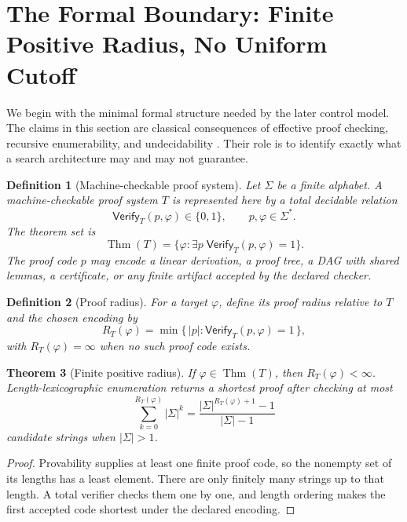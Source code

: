 \documentclass[11pt]{article}
\newtheorem{definition}{Definition}[section]
\newtheorem{theorem}[definition]{Theorem}
\newcommand{\Thm}{\operatorname{Thm}}
\newcommand{\Verify}{\mathsf{Verify}}
\begin{document}
\section{The Formal Boundary: Finite Positive Radius, No Uniform Cutoff}

We begin with the minimal formal structure needed by the later control model.
The claims in this section are classical consequences of effective proof
checking, recursive enumerability, and undecidability
\citep{church1936,turing1936,dean2025difficulty}.  Their role is to identify
exactly what a search architecture may and may not guarantee.

\begin{definition}[Machine-checkable proof system]\label{def:machine-checkable}
Let $\Sigma$ be a finite alphabet.  A machine-checkable proof system $T$ is
represented here by a total decidable relation
\[
  \Verify_T(p,\varphi)\in\{0,1\},
  \qquad p,\varphi\in\Sigma^*.
\]
The theorem set is
\[
  \Thm(T)=\{\varphi:\exists p\;\Verify_T(p,\varphi)=1\}.
\]
The proof code $p$ may encode a linear derivation, a proof tree, a DAG with
shared lemmas, a certificate, or any finite artifact accepted by the declared
checker.
\end{definition}

\begin{definition}[Proof radius]\label{def:proof-radius}
For a target $\varphi$, define its proof radius relative to $T$ and the chosen
encoding by
\[
  R_T(\varphi)=
  \min\{\,|p|:\Verify_T(p,\varphi)=1\,\},
\]
with $R_T(\varphi)=\infty$ when no such proof code exists.
\end{definition}

\begin{theorem}[Finite positive radius]
\label{thm:finite-radius}
If $\varphi\in\Thm(T)$, then $R_T(\varphi)<\infty$.  Length-lexicographic
enumeration returns a shortest proof after checking at most
\[
  \sum_{k=0}^{R_T(\varphi)}|\Sigma|^k
  =\frac{|\Sigma|^{R_T(\varphi)+1}-1}{|\Sigma|-1}
\]
candidate strings when $|\Sigma|>1$.
\end{theorem}

\begin{proof}
Provability supplies at least one finite proof code, so the nonempty set of its
lengths has a least element.  There are only finitely many strings up to that
length.  A total verifier checks them one by one, and length ordering makes the
first accepted code shortest under the declared encoding.
\end{proof}
\end{document}
